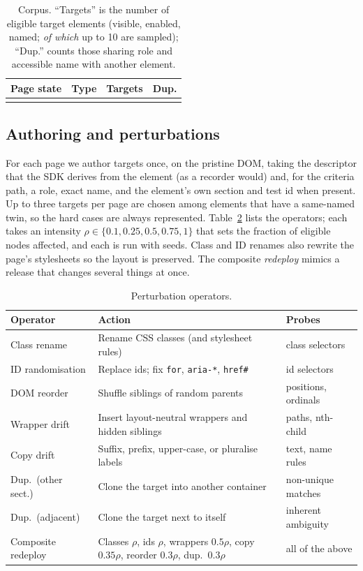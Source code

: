 \documentclass[conference]{IEEEtran}
\begin{document}
\begin{table}[!t]
\caption{Corpus. ``Targets'' is the number of eligible target elements (visible, enabled, named; \emph{of which} up to 10 are sampled); ``Dup.'' counts those sharing role and accessible name with another element.}
\label{tab:corpus}
\centering\scriptsize
\begin{tabular}{@{}p{4.6cm}lrr@{}}
\toprule
Page state & Type & Targets & Dup.\\
\midrule
\\
\bottomrule
\end{tabular}
\end{table}

\subsection{Authoring and perturbations}
For each page we author \nTargets{} targets once, on the pristine DOM, taking the descriptor that the SDK derives from the element (as a recorder would) and, for the criteria path, a role, exact name, and the element's own section and test id when present. Up to three targets per page are chosen among elements that have a same-named twin, so the hard cases are always represented. Table~\ref{tab:ops} lists the operators; each takes an intensity $\rho\in\{0.1,0.25,0.5,0.75,1\}$ that sets the fraction of eligible nodes affected, and each is run with \nSeeds{} seeds. Class and ID renames also rewrite the page's stylesheets so the layout is preserved. The composite \emph{redeploy} mimics a release that changes several things at once.

\begin{table}[!t]
\caption{Perturbation operators.}
\label{tab:ops}
\centering\scriptsize
\begin{tabular}{@{}p{1.9cm}p{3.5cm}p{1.9cm}@{}}
\toprule
Operator & Action & Probes\\
\midrule
Class rename & Rename CSS classes (and stylesheet rules) & class selectors\\
ID randomisation & Replace ids; fix \texttt{for}, \texttt{aria-*}, \texttt{href\#} & id selectors\\
DOM reorder & Shuffle siblings of random parents & positions, ordinals\\
Wrapper drift & Insert layout-neutral wrappers and hidden siblings & paths, nth-child\\
Copy drift & Suffix, prefix, upper-case, or pluralise labels & text, name rules\\
Dup.\ (other sect.) & Clone the target into another container & non-unique matches\\
Dup.\ (adjacent) & Clone the target next to itself & inherent ambiguity\\
Composite redeploy & Classes $\rho$, ids $\rho$, wrappers $0.5\rho$, copy $0.35\rho$, reorder $0.3\rho$, dup.\ $0.3\rho$ & all of the above\\
\bottomrule
\end{tabular}
\end{table}
\end{document}
